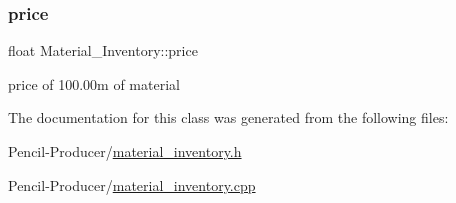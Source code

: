 \subsubsection{\texorpdfstring{price}{price}}
{\footnotesize\ttfamily float Material\+\_\+\+Inventory\+::price\hspace{0.3cm}{\ttfamily [private]}}



price of 100.\+00m of material 



The documentation for this class was generated from the following files\+:\begin{DoxyCompactItemize}
\item 
Pencil-\/\+Producer/\mbox{\hyperlink{material__inventory_8h}{material\+\_\+inventory.\+h}}\item 
Pencil-\/\+Producer/\mbox{\hyperlink{material__inventory_8cpp}{material\+\_\+inventory.\+cpp}}\end{DoxyCompactItemize}

